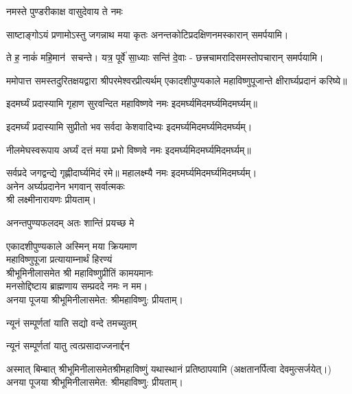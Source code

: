 \begin{center}
{नमस्ते पुण्डरीकाक्ष वासुदेवाय ते नमः}

{साष्टाङ्गोऽयं प्रणामोऽस्तु जगन्नाथ मया कृतः}
अनन्तकोटिप्रदक्षिणनमस्कारान् समर्पयामि।\medskip

{ते ह॒ नाकं॑ महि॒मान॑ सचन्ते। यत्र॒ पूर्वे॑ सा॒ध्याः सन्ति॑ दे॒वाः}
- छत्त्रचामरादिसमस्तोपचारान् समर्पयामि।\medskip

ममोपात्त समस्तदुरितक्षयद्वारा श्रीपरमेश्वरप्रीत्यर्थम् एकादशीपुण्यकाले  महाविष्णुपूजान्ते क्षीरार्घ्यप्रदानं करिष्ये॥
\medskip

{इदमर्घ्यं प्रदास्यामि गृहाण सुरवन्दित}
	महाविष्णवे नमः इदमर्घ्यमिदमर्घ्यमिदमर्घ्यम्॥\medskip

{इदमर्घ्यं प्रदास्यामि सुप्रीतो भव सर्वदा}
	केशवादिभ्यः इदमर्घ्यमिदमर्घ्यमिदमर्घ्यम्।\medskip

{नीलमेघस्वरूपाय अर्घ्यं दत्तं मया प्रभो}
	विष्णवे नमः इदमर्घ्यमिदमर्घ्यमिदमर्घ्यम्॥\medskip

{सर्वप्रदे जगद्वन्द्ये गृह्णीदार्घ्यमिदं रमे॥}
	महालक्ष्म्यै नमः इदमर्घ्यमिदमर्घ्यमिदमर्घ्यम्।\\
अनेन अर्घ्यप्रदानेन भगवान् सर्वात्मकः\\ श्री लक्ष्मीनारायणः प्रीयताम्।\medskip

{अनन्तपुण्यफलदम् अतः शान्तिं प्रयच्छ मे}

एकादशीपुण्यकाले अस्मिन् मया क्रियमाण\\
महाविष्णुपूजा प्रत्यायाम्नार्थं हिरण्यं\\
श्रीभूमिनीलासमेत श्री महाविष्णुप्रीतिं कामयमानः\\
मनसोद्दिष्टाय ब्राह्मणाय सम्प्रददे नमः न मम।\\ 
अनया पूजया श्रीभूमिनीलासमेत: श्रीमहाविष्णु: प्रीयताम्। 
 
{न्यूनं सम्पूर्णतां याति सद्यो वन्दे तमच्युतम्}

{न्यूनं सम्पूर्णतां यातु त्वत्प्रसादाज्जनार्द्दन}\medskip

अस्मात् बिम्बात् श्रीभूमिनीलासमेतश्रीमहाविष्णुं यथास्थानं प्रतिष्ठापयामि (अक्षतानर्पित्वा देवमुत्सर्जयेत्।)\\
अनया पूजया श्रीभूमिनीलासमेत: श्रीमहाविष्णु: प्रीयताम्।\medskip


\end{center}

